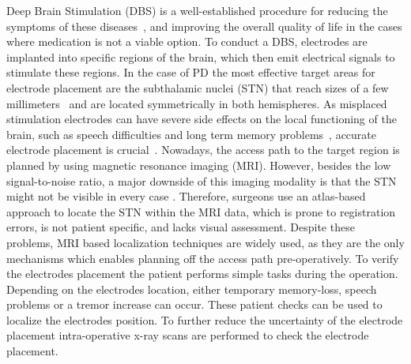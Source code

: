\documentclass{vgtc}                          %
\begin{document}
Deep Brain Stimulation (DBS) is a well-established procedure for reducing the symptoms of these diseases~\cite{Lindberg2002,Benabid2009}, and improving the overall quality of life in the cases where medication is not a viable option. To conduct a DBS, electrodes are implanted into specific regions of the brain, which then emit electrical signals to stimulate these regions. In the case of PD the most effective target areas for electrode placement are the subthalamic nuclei (STN) that reach sizes of a few millimeters~\cite{Richter2004} and are located symmetrically in both hemispheres. As misplaced stimulation electrodes can have severe side effects on the local functioning of the brain, such as speech difficulties and long term memory problems~\cite{Astrom2010}, accurate electrode placement is crucial~\cite{Rodriguez-Oroz2005}. Nowadays, the access path to the target region is planned by using magnetic resonance imaging (MRI). However, besides the low signal-to-noise ratio, a major downside of this imaging modality is that the STN might not be visible in every case \cite{Starr2002}. Therefore, surgeons use an atlas-based approach to locate the STN within the MRI data, which is prone to registration errors, is not patient specific, and lacks visual assessment. Despite these problems, MRI based localization techniques are widely used, as they are the only mechanisms which enables planning off the access path pre-operatively. To verify the electrodes placement the patient performs simple tasks during the operation. Depending on the electrodes location, either temporary memory-loss, speech problems or a tremor increase can occur. These patient checks can be used to localize the electrodes position. To further reduce the uncertainty of the electrode placement intra-operative x-ray scans are performed to check the electrode placement.
%
%
\end{document}
